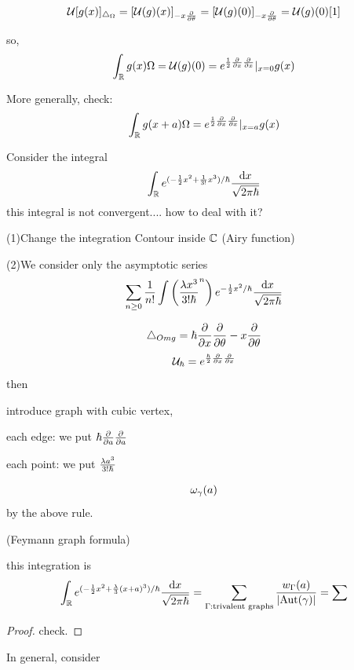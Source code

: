 $$\mathcal{U}[g(x)]_{\triangle_{\Omega}}=[\mathcal{U}(g)(x)]_{-x\frac{\partial } {\partial \theta}}
=[\mathcal{U}(g)(0)]_{-x\frac{\partial } {\partial \theta}}
=\mathcal{U}(g)(0)[1]$$

so,
$$\int_{\mathbb{R}}g(x)\Omega=\mathcal{U}(g)(0)=
e^{\frac{1}{2}\frac{\partial } {\partial x}\frac{\partial } {\partial x}}|_{x=0}g(x)$$

More generally, check:
$$\int_{\mathbb{R}}g(x+a)\Omega=
e^{\frac{1}{2}\frac{\partial } {\partial x}\frac{\partial } {\partial x}}|_{x=a}g(x)$$


\begin{example}
Consider the integral
$$
  \int_{\mathbb{R}}
    e^{(-\frac{1}{2}x^2+\frac{1}{3!}x^3)/\hbar}
    \frac{\mathrm{d} x}{\sqrt{2\pi\hbar}}
$$
this integral is not convergent.... how to deal with it?

(1)Change the integration Contour inside $\mathbb{C}$
(Airy function)

(2)We consider only the asymptotic series
$$
  \sum_{n\geq 0}\frac{1}{n!}
    \int
      \left(
        \frac{\lambda x^3}{3!\hbar}^n
      \right)
      e^{-\frac{1}{2}x^2/\hbar}
      \frac{\mathrm{d} x}{\sqrt{2\pi\hbar}}
$$

$$\triangle_{Omg}=\hbar\frac{\partial } {\partial x}\frac{\partial } {\partial \theta}-x\frac{\partial } {\partial \theta}$$
$$\mathcal{U}_{\hbar}=e^{\frac{\hbar}{2}\frac{\partial } {\partial x}\frac{\partial } {\partial x}}$$
then

introduce graph with cubic vertex,

each edge: we put $\hbar\frac{\partial } {\partial a}\frac{\partial } {\partial a}$

each point: we put $\frac{\lambda a^3}{3!\hbar}$

$$\omega_{\gamma}(a)$$
by the above rule.

\end{example}

\begin{thm}(Feymann graph formula)

this integration is
$$
   \int_{\mathbb{R}}
     e^{(-\frac{1}{2}x^2+\frac{\lambda}{3}(x+a)^3)/\hbar}
     \frac{\mathrm{d} x}{\sqrt{2\pi\hbar}}
=
   \sum_{\Gamma:\text{trivalent graphs}}
     \frac{w_{\Gamma}(a)}
          {|\text{Aut}(\gamma)|}
=
   \sum
$$
\end{thm}
\begin{proof}
check.
\end{proof}

In general, consider










